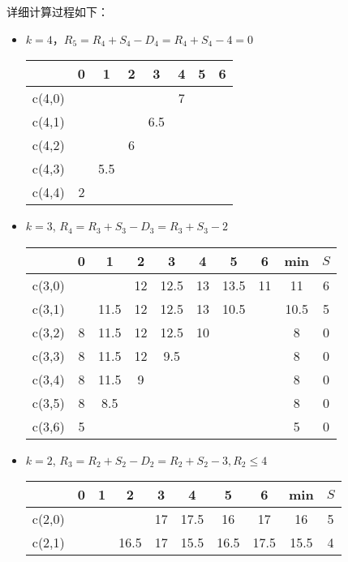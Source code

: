 \documentclass{article}
\begin{document}
\begin{enumerate}
		详细计算过程如下：
		\begin{itemize}
			\item $k=4$，$R_5=R_4+S_4-D_4=R_4+S_4-4=0$
				\begin{table}[H]
					\centering
					\begin{tabular}{c|c|c|c|c|c|c|c}
						\hline\hline
						    & 0 & 1 & 2 & 3 & 4 & 5  & 6 \\ \hline    
						c(4,0)& & & & & 7& &\\ \hline
						c(4,1)& & & & 6.5& & &\\ \hline
						c(4,2)& & & 6& & & &\\ \hline
						c(4,3)& & 5.5& & & & &\\ \hline
						c(4,4)& 2& & & & & &\\\hline
						\hline
					\end{tabular}
				\end{table}
			\item $k=3$, $R_4=R_3+S_3-D_3=R_3+S_3-2$
				\begin{table}[H]
					\centering
					\begin{tabular}{c|c|c|c|c|c|c|c|c|c}
						\hline\hline
						& 0 & 1 & 2 & 3 & 4 & 5  & 6 & min & $S$\\ \hline    
						c(3,0)& & & 12& 12.5& 13& 13.5& 11& 11& 6\\ \hline
						c(3,1)& & 11.5& 12& 12.5& 13& 10.5& & 10.5& 5\\ \hline
						c(3,2)& 8& 11.5& 12& 12.5& 10& & & 8&0 \\ \hline
						c(3,3)& 8& 11.5& 12& 9.5& & & & 8&0 \\ \hline
						c(3,4)& 8& 11.5& 9& & & & & 8& 0\\ \hline
						c(3,5)& 8& 8.5& & & & & & 8& 0\\ \hline
						c(3,6)& 5& & & & & & & 5& 0\\ \hline
						\hline
					\end{tabular}
				\end{table}
			\item $k=2$, $R_3=R_2+S_2-D_2=R_2+S_2-3, R_2\leq4$
				\begin{table}[H]
					\centering
					\begin{tabular}{c|c|c|c|c|c|c|c|c|c}
						\hline \hline
						& 0 & 1 & 2 & 3 & 4 & 5  & 6 & min & $S$\\ \hline    
						c(2,0)& & & & 17& 17.5& 16& 17& 16& 5\\ \hline
						c(2,1)& & & 16.5& 17& 15.5& 16.5& 17.5& 15.5& 4\\ \hline

\end{tabular}
\end{table}
\end{itemize}
\end{enumerate}
\end{document}
